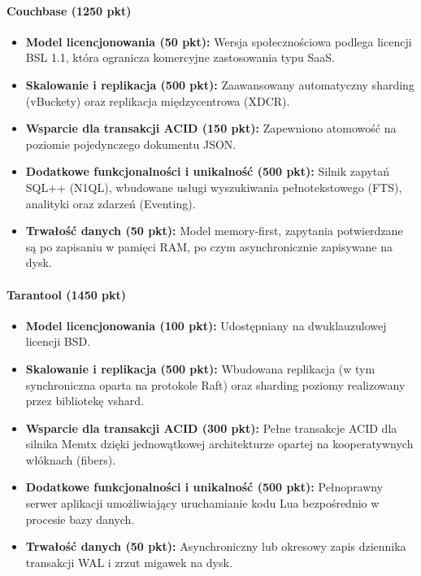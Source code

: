 \paragraph{Couchbase (1250 pkt)}
\begin{itemize}
    \item \textbf{Model licencjonowania (50 pkt):} Wersja społecznościowa podlega licencji BSL 1.1, która ogranicza komercyjne zastosowania typu SaaS.
    \item \textbf{Skalowanie i replikacja (500 pkt):} Zaawansowany automatyczny sharding (vBuckety) oraz replikacja międzycentrowa (XDCR).
    \item \textbf{Wsparcie dla transakcji ACID (150 pkt):} Zapewniono atomowość na poziomie pojedynczego dokumentu JSON.
    \item \textbf{Dodatkowe funkcjonalności i unikalność (500 pkt):} Silnik zapytań SQL++ (N1QL), wbudowane usługi wyszukiwania pełnotekstowego (FTS), analityki oraz zdarzeń (Eventing).
    \item \textbf{Trwałość danych (50 pkt):} Model memory-first, zapytania potwierdzane są po zapisaniu w pamięci RAM, po czym asynchronicznie zapisywane na dysk.
\end{itemize}

\paragraph{Tarantool (1450 pkt)}
\begin{itemize}
    \item \textbf{Model licencjonowania (100 pkt):} Udostępniany na dwuklauzulowej licencji BSD.
    \item \textbf{Skalowanie i replikacja (500 pkt):} Wbudowana replikacja (w tym synchroniczna oparta na protokole Raft) oraz sharding poziomy realizowany przez bibliotekę vshard.
    \item \textbf{Wsparcie dla transakcji ACID (300 pkt):} Pełne transakcje ACID dla silnika Memtx dzięki jednowątkowej architekturze opartej na kooperatywnych włóknach (fibers).
    \item \textbf{Dodatkowe funkcjonalności i unikalność (500 pkt):} Pełnoprawny serwer aplikacji umożliwiający uruchamianie kodu Lua bezpośrednio w procesie bazy danych.
    \item \textbf{Trwałość danych (50 pkt):} Asynchroniczny lub okresowy zapis dziennika transakcji WAL i zrzut migawek na dysk.
\end{itemize}

